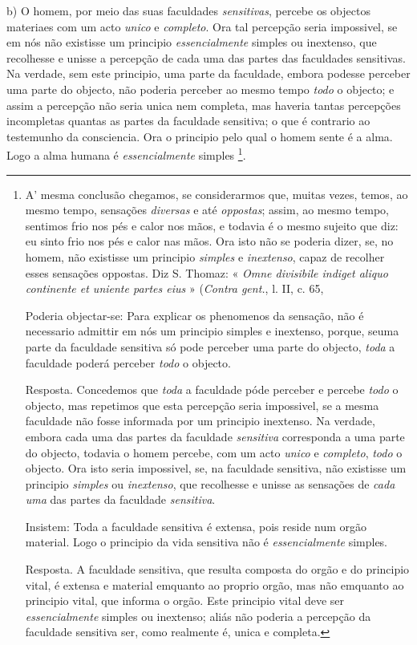 b) O homem, por meio das suas faculdades \emph{sensitivas}, percebe os objectos materiaes com um acto \emph{unico} e \emph{completo}. Ora tal percepção seria impossivel, se em nós não existisse um principio \emph{essencialmente} simples ou inextenso, que recolhesse e unisse a percepção de cada uma das partes das faculdades sensitivas. Na verdade, sem este principio, uma parte da faculdade, embora podesse perceber uma parte do objecto, não poderia perceber ao mesmo tempo \emph{todo} o objecto; e assim a percepção não seria unica nem completa, mas haveria tantas percepções incompletas quantas as partes da faculdade sensitiva; o que é contrario ao testemunho da consciencia. Ora o principio pelo qual o homem sente é a alma. Logo a alma humana é \emph{essencialmente} simples \footnote{A' mesma conclusão chegamos, se considerarmos que, muitas vezes, temos, ao mesmo tempo, sensações \emph{diversas} e até \emph{oppostas}; assim, ao mesmo tempo, sentimos frio nos pés e calor nos mãos, e todavia é o mesmo sujeito que diz: eu sinto frio nos pés e calor nas mãos. Ora isto não se poderia dizer, se, no homem, não existisse um principio \emph{simples} e \emph{inextenso}, capaz de recolher esses sensações oppostas. Diz S. Thomaz: « \emph{Omne divisibile indiget aliquo continente et uniente partes eius} » (\emph{Contra gent.}, l. II, c. 65,\par Poderia objectar-se: Para explicar os phenomenos da sensação, não é necessario admittir em nós um principio simples e inextenso, porque, seuma parte da faculdade sensitiva só pode perceber uma parte do objecto, \emph{toda} a faculdade poderá perceber \emph{todo} o objecto.\par Resposta. Concedemos que \emph{toda} a faculdade póde perceber e percebe \emph{todo} o objecto, mas repetimos que esta percepção seria impossivel, se a mesma faculdade não fosse informada por um principio inextenso. Na verdade, embora cada uma das partes da faculdade \emph{sensitiva} corresponda a uma parte do objecto, todavia o homem percebe, com um acto \emph{unico} e \emph{completo}, \emph{todo} o objecto. Ora isto seria impossivel, se, na faculdade sensitiva, não existisse um principio \emph{simples} ou \emph{inextenso}, que recolhesse e unisse as sensações de \emph{cada uma} das partes da faculdade \emph{sensitiva}.\par Insistem: Toda a faculdade sensitiva é extensa, pois reside num orgão material. Logo o principio da vida sensitiva não é \emph{essencialmente} simples.\par Resposta. A faculdade sensitiva, que resulta composta do orgão e do principio vital, é extensa e material emquanto ao proprio orgão, mas não emquanto ao principio vital, que informa o orgão. Este principio vital deve ser \emph{essencialmente} simples ou inextenso; aliás não poderia a percepção da faculdade sensitiva ser, como realmente é, unica e completa.}.

